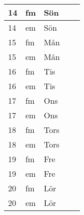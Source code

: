 \documentclass[a4paper]{article}
\begin{document}
\begin{table}[ht!]
\begin{tabular}{lllp{7cm}p{7cm}}
\multicolumn{1}{|l|}{14} & \multicolumn{1}{l|}{fm} & \multicolumn{1}{l|}{Sön} & \multicolumn{1}{l|}{} & \multicolumn{1}{l|}{} \\ \hline
\multicolumn{1}{|l|}{14} & \multicolumn{1}{l|}{em} & \multicolumn{1}{l|}{Sön} & \multicolumn{1}{l|}{} & \multicolumn{1}{l|}{} \\ \hline    

\multicolumn{1}{|l|}{15} & \multicolumn{1}{l|}{fm} & \multicolumn{1}{l|}{Mån} & \multicolumn{1}{l|}{} & \multicolumn{1}{l|}{} \\ \hline
\multicolumn{1}{|l|}{15} & \multicolumn{1}{l|}{em} & \multicolumn{1}{l|}{Mån} & \multicolumn{1}{l|}{} & \multicolumn{1}{l|}{} \\ \hline    

\multicolumn{1}{|l|}{16} & \multicolumn{1}{l|}{fm} & \multicolumn{1}{l|}{Tis} & \multicolumn{1}{l|}{} & \multicolumn{1}{l|}{} \\ \hline
\multicolumn{1}{|l|}{16} & \multicolumn{1}{l|}{em} & \multicolumn{1}{l|}{Tis} & \multicolumn{1}{l|}{} & \multicolumn{1}{l|}{} \\ \hline    

\multicolumn{1}{|l|}{17} & \multicolumn{1}{l|}{fm} & \multicolumn{1}{l|}{Ons} & \multicolumn{1}{l|}{} & \multicolumn{1}{l|}{} \\ \hline
\multicolumn{1}{|l|}{17} & \multicolumn{1}{l|}{em} & \multicolumn{1}{l|}{Ons} & \multicolumn{1}{l|}{} & \multicolumn{1}{l|}{} \\ \hline    

\multicolumn{1}{|l|}{18} & \multicolumn{1}{l|}{fm} & \multicolumn{1}{l|}{Tors} & \multicolumn{1}{l|}{} & \multicolumn{1}{l|}{} \\ \hline
\multicolumn{1}{|l|}{18} & \multicolumn{1}{l|}{em} & \multicolumn{1}{l|}{Tors} & \multicolumn{1}{l|}{} & \multicolumn{1}{l|}{} \\ \hline    

\multicolumn{1}{|l|}{19} & \multicolumn{1}{l|}{fm} & \multicolumn{1}{l|}{Fre} & \multicolumn{1}{l|}{} & \multicolumn{1}{l|}{} \\ \hline
\multicolumn{1}{|l|}{19} & \multicolumn{1}{l|}{em} & \multicolumn{1}{l|}{Fre} & \multicolumn{1}{l|}{} & \multicolumn{1}{l|}{} \\ \hline    

\multicolumn{1}{|l|}{20} & \multicolumn{1}{l|}{fm} & \multicolumn{1}{l|}{Lör} & \multicolumn{1}{l|}{} & \multicolumn{1}{l|}{} \\ \hline
\multicolumn{1}{|l|}{20} & \multicolumn{1}{l|}{em} & \multicolumn{1}{l|}{Lör} & \multicolumn{1}{l|}{} & \multicolumn{1}{l|}{} \\ \hline    


\end{tabular}
\end{table}
\end{document}
